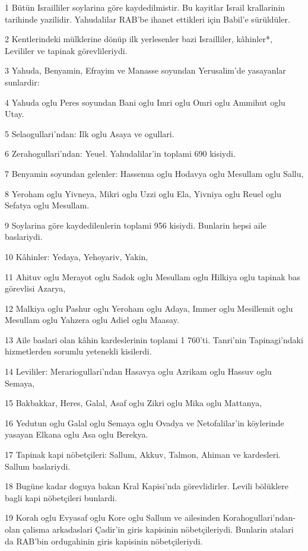 \par 1 Bütün Israilliler soylarina göre kaydedilmistir. Bu kayitlar Israil krallarinin tarihinde yazilidir. Yahudalilar RAB'be ihanet ettikleri için Babil'e sürüldüler.
\par 2 Kentlerindeki mülklerine dönüp ilk yerlesenler bazi Israilliler, kâhinler*, Levililer ve tapinak görevlileriydi.
\par 3 Yahuda, Benyamin, Efrayim ve Manasse soyundan Yerusalim'de yasayanlar sunlardir:
\par 4 Yahuda oglu Peres soyundan Bani oglu Imri oglu Omri oglu Ammihut oglu Utay.
\par 5 Selaogullari'ndan: Ilk oglu Asaya ve ogullari.
\par 6 Zerahogullari'ndan: Yeuel. Yahudalilar'in toplami 690 kisiydi.
\par 7 Benyamin soyundan gelenler: Hassenua oglu Hodavya oglu Mesullam oglu Sallu,
\par 8 Yeroham oglu Yivneya, Mikri oglu Uzzi oglu Ela, Yivniya oglu Reuel oglu Sefatya oglu Mesullam.
\par 9 Soylarina göre kaydedilenlerin toplami 956 kisiydi. Bunlarin hepsi aile baslariydi.
\par 10 Kâhinler: Yedaya, Yehoyariv, Yakin,
\par 11 Ahituv oglu Merayot oglu Sadok oglu Mesullam oglu Hilkiya oglu tapinak bas görevlisi Azarya,
\par 12 Malkiya oglu Pashur oglu Yeroham oglu Adaya, Immer oglu Mesillemit oglu Mesullam oglu Yahzera oglu Adiel oglu Maasay.
\par 13 Aile baslari olan kâhin kardeslerinin toplami 1 760'ti. Tanri'nin Tapinagi'ndaki hizmetlerden sorumlu yetenekli kisilerdi.
\par 14 Levililer: Merariogullari'ndan Hasavya oglu Azrikam oglu Hassuv oglu Semaya,
\par 15 Bakbakkar, Heres, Galal, Asaf oglu Zikri oglu Mika oglu Mattanya,
\par 16 Yedutun oglu Galal oglu Semaya oglu Ovadya ve Netofalilar'in köylerinde yasayan Elkana oglu Asa oglu Berekya.
\par 17 Tapinak kapi nöbetçileri: Sallum, Akkuv, Talmon, Ahiman ve kardesleri. Sallum baslariydi.
\par 18 Bugüne kadar doguya bakan Kral Kapisi'nda görevlidirler. Levili bölüklere bagli kapi nöbetçileri bunlardi.
\par 19 Korah oglu Evyasaf oglu Kore oglu Sallum ve ailesinden Korahogullari'ndan- olan çalisma arkadaslari Çadir'in giris kapisinin nöbetçileriydi. Bunlarin atalari da RAB'bin ordugahinin giris kapisinin nöbetçileriydi.

